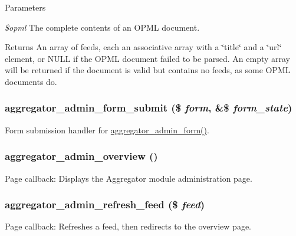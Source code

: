 \begin{DoxyParams}{Parameters}
\item[{\em \$opml}]The complete contents of an OPML document.\end{DoxyParams}
\begin{DoxyReturn}{Returns}
An array of feeds, each an associative array with a \char`\"{}title\char`\"{} and a \char`\"{}url\char`\"{} element, or NULL if the OPML document failed to be parsed. An empty array will be returned if the document is valid but contains no feeds, as some OPML documents do. 
\end{DoxyReturn}
\hypertarget{aggregator_8admin_8inc_a9cabb7efcb8d2475b259921beffc8776}{
\subsubsection[{aggregator\_\-admin\_\-form\_\-submit}]{\setlength{\rightskip}{0pt plus 5cm}aggregator\_\-admin\_\-form\_\-submit (\$ {\em form}, \/  \&\$ {\em form\_\-state})}}
\label{aggregator_8admin_8inc_a9cabb7efcb8d2475b259921beffc8776}
Form submission handler for \hyperlink{group__forms_gaf74e45e5f77c20f8e8483e13aea0d25c}{aggregator\_\-admin\_\-form()}. \hypertarget{aggregator_8admin_8inc_a9fe4f30b63dd656ba52c3af570556272}{
\subsubsection[{aggregator\_\-admin\_\-overview}]{\setlength{\rightskip}{0pt plus 5cm}aggregator\_\-admin\_\-overview ()}}
\label{aggregator_8admin_8inc_a9fe4f30b63dd656ba52c3af570556272}
Page callback: Displays the Aggregator module administration page. \hypertarget{aggregator_8admin_8inc_aeb33d62d98fcdc9c66379002613f497b}{
\subsubsection[{aggregator\_\-admin\_\-refresh\_\-feed}]{\setlength{\rightskip}{0pt plus 5cm}aggregator\_\-admin\_\-refresh\_\-feed (\$ {\em feed})}}
\label{aggregator_8admin_8inc_aeb33d62d98fcdc9c66379002613f497b}
Page callback: Refreshes a feed, then redirects to the overview page.


